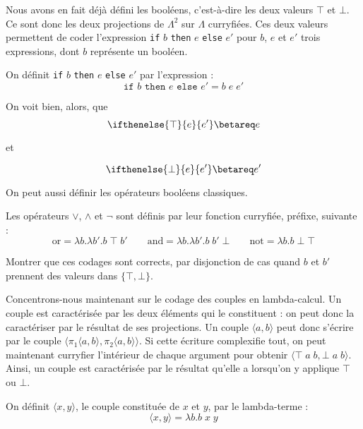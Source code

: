 Nous avons en fait déjà défini les booléens, c'est-à-dire les deux valeurs $\top$ et $\bot$. Ce sont donc les deux projections de $\Lambda^2$ sur $\Lambda$ curryfiées. Ces deux valeurs permettent de coder l'expression \texttt{if} $b$ \texttt{then} $e$ \texttt{else} $e'$ pour $b$, $e$ et $e'$ trois expressions, dont $b$ représente un booléen.

\begin{defi}
    On définit \texttt{if} $b$ \texttt{then} $e$ \texttt{else} $e'$ par l'expression :
    $$\texttt{if }b \texttt{ then }e \texttt{ else }e' = b\; e\; e'$$
\end{defi}

On voit bien, alors, que $$\ifthenelse{\top}{e}{e'}\betareq e$$\begin{center} et\end{center}$$\ifthenelse{\bot}{e}{e'}\betareq e'$$

On peut aussi définir les opérateurs booléens classiques.

\begin{defi}
    Les opérateurs $\lor$, $\land$ et $\lnot$ sont définis par leur fonction curryfiée, préfixe, suivante :
    $$\mathrm{or}=\lambda b.\lambda b'. b \;\top \;b'\qquad \mathrm{and}=\lambda b.\lambda b'.b \;b'\;\bot\qquad \mathrm{not}=\lambda b. b \;\bot\;\top$$
\end{defi}

\begin{exo}
    Montrer que ces codages sont corrects, par disjonction de cas quand $b$ et $b'$ prennent des valeurs dans $\{\top,\bot\}$.
\end{exo}

Concentrons-nous maintenant sur le codage des couples en lambda-calcul. Un couple est caractérisée par les deux éléments qui le constituent : on peut donc la caractériser par le résultat de ses projections. Un couple $\langle a,b\rangle$ peut donc s'écrire par le couple $\langle \pi_1\langle a,b\rangle,\pi_2\langle a,b\rangle\rangle$. Si cette écriture complexifie tout, on peut maintenant curryfier l'intérieur de chaque argument pour obtenir $\langle \top\;a\;b,\bot\;a\;b\rangle$. Ainsi, un couple est caractérisée par le résultat qu'elle a lorsqu'on y applique $\top$ ou $\bot$.

\begin{defi}[Couple]
    On définit $\langle x,y\rangle$, le couple constituée de $x$ et $y$, par le lambda-terme :
    $$\langle x,y\rangle = \lambda b.b\;x\;y$$
\end{defi}

